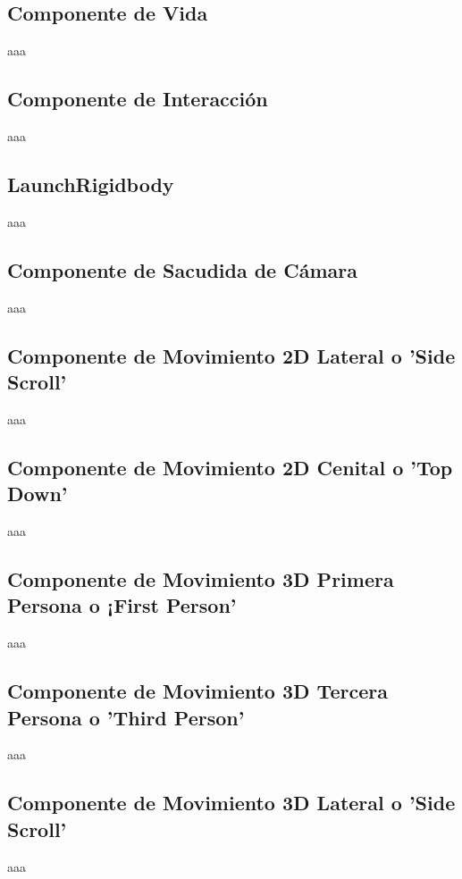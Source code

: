 \subsection{Componente de Vida}
aaa

\subsection{Componente de Interacción}
aaa

\subsection{LaunchRigidbody}
aaa

\subsection{Componente de Sacudida de Cámara}
aaa

\subsection{Componente de Movimiento 2D Lateral o 'Side Scroll'}
aaa

\subsection{Componente de Movimiento 2D Cenital o 'Top Down'}
aaa

\subsection{Componente de Movimiento 3D Primera Persona o ¡First Person'}
aaa

\subsection{Componente de Movimiento 3D Tercera Persona o 'Third Person'}
aaa

\subsection{Componente de Movimiento 3D Lateral o 'Side Scroll'}
aaa

